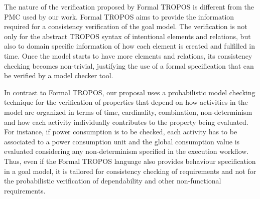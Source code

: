 The nature of the verification proposed by Formal TROPOS is different from the PMC used by our work. Formal TROPOS aims to provide the information required for a consistency verification of the goal model. The verification is not only for the abstract TROPOS syntax of intentional elements and relations, but also to domain specific information of how each element is created and fulfilled in time. Once the model starts to have more elements and relations, its consistency checking becomes non-trivial, justifying the use of a formal specification that can be verified by a model checker tool. 


In contrast to Formal TROPOS, our proposal uses a probabilistic model checking technique for the verification of properties that depend on how activities in the model are organized in terms of time, cardinality, combination, non-determinism and how each activity individually contributes to the property being evaluated. For instance, if power consumption is to be checked, each activity has to be associated to a power consumption unit and the global consumption value is evaluated considering any non-determinism specified in the execution workflow. Thus, even if the Formal TROPOS language also provides behaviour specification in a goal model, it is tailored for consistency checking of requirements and not for the probabilistic verification of dependability and other non-functional requirements.